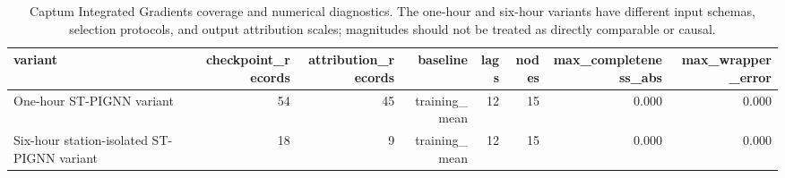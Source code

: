 \begin{table}[t]
\centering
\scriptsize
\caption{Captum Integrated Gradients coverage and numerical diagnostics. The one-hour and six-hour variants have different input schemas, selection protocols, and output attribution scales; magnitudes should not be treated as directly comparable or causal.}
\label{tab:t06_captum_verification}
\begin{tabular}{lrrrrrrr}
\hline
variant & checkpoint\_records & attribution\_records & baseline & lags & nodes & max\_completeness\_abs & max\_wrapper\_error \\
\hline
One-hour ST-PIGNN variant & 54 & 45 & training\_mean & 12 & 15 & 0.000 & 0.000 \\
Six-hour station-isolated ST-PIGNN variant & 18 & 9 & training\_mean & 12 & 15 & 0.000 & 0.000 \\
\hline
\end{tabular}
\end{table}
